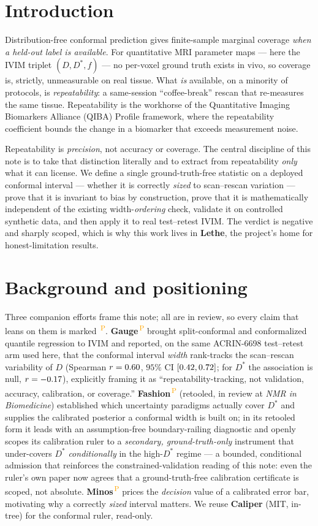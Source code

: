 \documentclass[11pt]{article}
\newcommand{\PROV}{\textsuperscript{\textcolor{orange}{\,P}}}
\newcommand{\Dstar}{D^{*}}
\begin{document}
\section{Introduction}\label{sec:intro}
Distribution-free conformal prediction gives finite-sample marginal coverage \emph{when a
held-out label is available}. For quantitative MRI parameter maps --- here the IVIM triplet
$(D,\Dstar,f)$ --- no per-voxel ground truth exists in vivo, so coverage is, strictly,
unmeasurable on real tissue. What \emph{is} available, on a minority of protocols, is
\emph{repeatability}: a same-session ``coffee-break'' rescan that re-measures the same
tissue. Repeatability is the workhorse of the Quantitative Imaging Biomarkers Alliance
(QIBA) Profile framework, where the repeatability coefficient bounds the change in a
biomarker that exceeds measurement noise.

Repeatability is \emph{precision}, not accuracy or coverage. The central discipline of this
note is to take that distinction literally and to extract from repeatability \emph{only}
what it can license. We define a single ground-truth-free statistic on a deployed conformal
interval --- whether it is correctly \emph{sized} to scan--rescan variation --- prove that
it is invariant to bias by construction, prove that it is mathematically independent of the
existing width-\emph{ordering} check, validate it on controlled synthetic data, and then
apply it to real test--retest IVIM. The verdict is negative and sharply scoped, which is
why this work lives in \textbf{Lethe}, the project's home for honest-limitation results.

\section{Background and positioning}\label{sec:bg}
Three companion efforts frame this note; all are in review, so every claim that leans on
them is marked \PROV{}. \textbf{Gauge}\PROV{} brought split-conformal and conformalized
quantile regression to IVIM and reported, on the same ACRIN-6698 test--retest arm used
here, that the conformal interval \emph{width} rank-tracks the scan--rescan variability of
$D$ (Spearman $r=0.60$, $95\%$ CI $[0.42,0.72]$; for $\Dstar$ the
association is null, $r=-0.17$), explicitly framing it as ``repeatability-tracking,
not validation, accuracy, calibration, or coverage.'' \textbf{Fashion}\PROV{} (retooled,
in review at \textit{NMR in Biomedicine}) established which uncertainty paradigms actually
cover $\Dstar$ and supplies the calibrated posterior a conformal width is built on; in its
retooled form it leads with an assumption-free boundary-railing diagnostic and openly scopes
its calibration ruler to a \emph{secondary, ground-truth-only} instrument that under-covers
$\Dstar$ \emph{conditionally} in the high-$\Dstar$ regime --- a bounded, conditional admission
that reinforces the constrained-validation reading of this note: even the ruler's own paper
now agrees that a ground-truth-free calibration certificate is scoped, not absolute.
\textbf{Minos}\PROV{} prices the \emph{decision} value of a
calibrated error bar, motivating why a correctly \emph{sized} interval matters. We reuse
\textbf{Caliper} (MIT, in-tree) for the conformal ruler, read-only.
\end{document}
